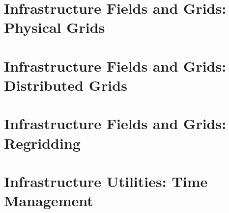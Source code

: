 \documentclass[english]{article}
\newcommand{\shortname}{GR}
\begin{document}
\part{Infrastructure Fields and Grids: Physical Grids}

\setcounter{section}{0}
\renewcommand{\thesection}{\shortname\arabic{section}}
\renewcommand{\thesubsection}{\shortname\arabic{section}.\arabic{subsection}}
\renewcommand{\thesubsubsection}{\shortname\arabic{section}.\arabic{subsection}.\arabic{subsubsection}}



\newpage
\begin{htmlonly}
\end{htmlonly}
\part{Infrastructure Fields and Grids: Distributed Grids}

\setcounter{section}{0}
\renewcommand{\thesection}{\shortname\arabic{section}}
\renewcommand{\thesubsection}{\shortname\arabic{section}.\arabic{subsection}}
\renewcommand{\thesubsubsection}{\shortname\arabic{section}.\arabic{subsection}.\arabic{subsubsection}}



\newpage
\begin{htmlonly}
\end{htmlonly}
\part{Infrastructure Fields and Grids: Regridding}

\setcounter{section}{0}
\renewcommand{\thesection}{\shortname\arabic{section}}
\renewcommand{\thesubsection}{\shortname\arabic{section}.\arabic{subsection}}
\renewcommand{\thesubsubsection}{\shortname\arabic{section}.\arabic{subsection}.\arabic{subsubsection}}



\newpage
\begin{htmlonly}
\end{htmlonly}
\part{Infrastructure Utilities: Time Management}
\end{document}
